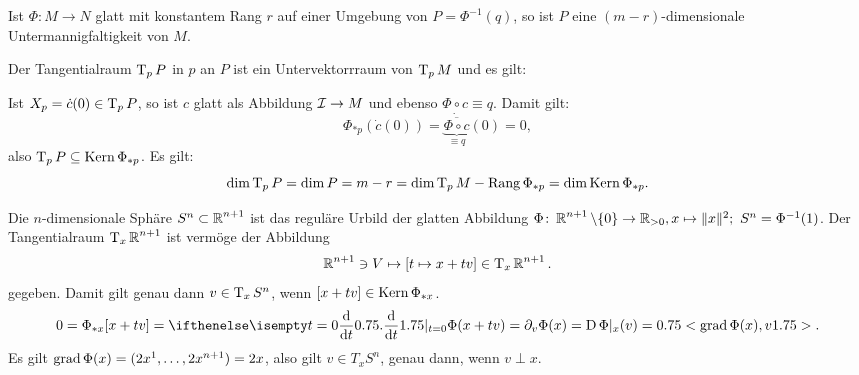 \begin{bem}
  Ist $\Phi \colon M \to N$ glatt mit konstantem Rang $r$ auf einer Umgebung von $P = \Phi^{-1}(q)$, so ist $P$ eine $(m-r)$-dimensionale Untermannigfaltigkeit von $M$.
  
  Der Tangentialraum $\operatorname{T}_pP$ in $p$ an $P$ ist ein Untervektorrraum von $\operatorname{T}_pM$ und es gilt:
  \begin{center}\end{center}

  Ist $X_p = \dot c(0) \in \operatorname{T}_pP$, so ist $c$ glatt als Abbildung $\operatorname{\mathcal{I}} \to M$ und ebenso $\Phi \circ c \equiv q$.
  Damit gilt:
    \[ \Phi_{*p}(\dot c(0)) = \dot{\underbrace{\overline{\Phi \circ c}}_{\equiv q}}(0) = 0, \]
  also $\operatorname{T}_pP \subseteq \operatorname{Kern} \Phi_{*p}$. Es gilt:
   \[ \dim \operatorname{T}_pP = \dim P = m-r = \dim \operatorname{T}_pM - \operatorname{Rang} \Phi_{*p} = \dim \operatorname{Kern} \Phi_{*p}. \]
\end{bem}

\begin{Bsp}
  Die $n$-dimensionale Sphäre $S^n \subset \operatorname{\mathbb{R}}^{n+1}$ ist das reguläre Urbild der glatten Abbildung $\Phi \colon \operatorname{\mathbb{R}}^{n+1}\setminus \{0\} \to \operatorname{\mathbb{R}}_{> 0}, x \mapsto \|x\|^2; \ S^n = \Phi^{-1}(1)$. Der Tangentialraum $\operatorname{T}_x\operatorname{\mathbb{R}}^{n+1}$ ist vermöge der Abbildung
\begin{align*}
  \operatorname{\mathbb{R}}^{n+1} \ni V \mapsto [t \mapsto x + tv] \in \operatorname{T}_x\operatorname{\mathbb{R}}^{n+1}.
\end{align*}
gegeben. Damit gilt genau dann $v \in \operatorname{T}_xS^n$, wenn $[x+tv] \in \operatorname{Kern} \Phi_{*x}$.
\begin{align*}
  0 = \Phi_{*x}[x+tv] = \difffrac[t=0]{}{t} \Phi(x+tv) = \partial_v \Phi(x) = \D \Phi|_x(v) = \left<\grad\Phi(x),v\right>.
\end{align*}
Es gilt $\operatorname{grad} \Phi(x) = (2x^1, \ldots, 2x^{n+1}) = 2x$, also gilt $v \in T_xS^n$, genau dann, wenn $v \perp x$.
\end{Bsp}


